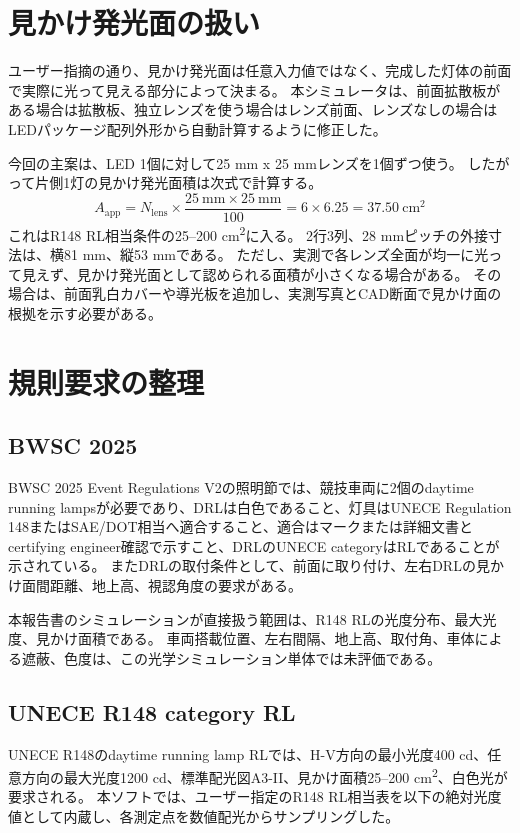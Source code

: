 \documentclass[11pt,a4paper]{article}
\begin{document}
\section{見かけ発光面の扱い}
ユーザー指摘の通り、見かけ発光面は任意入力値ではなく、完成した灯体の前面で実際に光って見える部分によって決まる。
本シミュレータは、前面拡散板がある場合は拡散板、独立レンズを使う場合はレンズ前面、レンズなしの場合はLEDパッケージ配列外形から自動計算するように修正した。

今回の主案は、LED 1個に対して25 mm x 25 mmレンズを1個ずつ使う。
したがって片側1灯の見かけ発光面積は次式で計算する。
\[
A_\mathrm{app}
= N_\mathrm{lens} \times \frac{25~\mathrm{mm}\times25~\mathrm{mm}}{100}
= 6 \times 6.25
= 37.50~\mathrm{cm^2}
\]
これはR148 RL相当条件の25--200 cm\textsuperscript{2}に入る。
2行3列、28 mmピッチの外接寸法は、横81 mm、縦53 mmである。
ただし、実測で各レンズ全面が均一に光って見えず、見かけ発光面として認められる面積が小さくなる場合がある。
その場合は、前面乳白カバーや導光板を追加し、実測写真とCAD断面で見かけ面の根拠を示す必要がある。

\section{規則要求の整理}
\subsection{BWSC 2025}
BWSC 2025 Event Regulations V2の照明節では、競技車両に2個のdaytime running lampsが必要であり、DRLは白色であること、灯具はUNECE Regulation 148またはSAE/DOT相当へ適合すること、適合はマークまたは詳細文書とcertifying engineer確認で示すこと、DRLのUNECE categoryはRLであることが示されている。
またDRLの取付条件として、前面に取り付け、左右DRLの見かけ面間距離、地上高、視認角度の要求がある。

本報告書のシミュレーションが直接扱う範囲は、R148 RLの光度分布、最大光度、見かけ面積である。
車両搭載位置、左右間隔、地上高、取付角、車体による遮蔽、色度は、この光学シミュレーション単体では未評価である。

\subsection{UNECE R148 category RL}
UNECE R148のdaytime running lamp RLでは、H-V方向の最小光度400 cd、任意方向の最大光度1200 cd、標準配光図A3-II、見かけ面積25--200 cm\textsuperscript{2}、白色光が要求される。
本ソフトでは、ユーザー指定のR148 RL相当表を以下の絶対光度値として内蔵し、各測定点を数値配光からサンプリングした。
\end{document}
